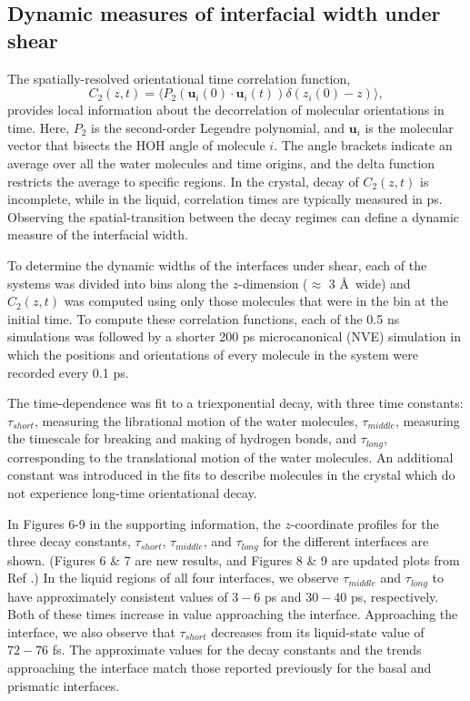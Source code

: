 \subsection{Dynamic measures of interfacial width under shear}
The spatially-resolved orientational time correlation function,
\begin{equation}\label{C(t)1}
  C_{2}(z,t)=\langle P_{2}(\mathbf{u}_i(0)\cdot \mathbf{u}_i(t))
  \delta(z_i(0) - z) \rangle,
\end{equation}
provides local information about the decorrelation of molecular
orientations in time. Here, $P_{2}$ is the second-order Legendre
polynomial, and $\mathbf{u}_i$ is the molecular vector that bisects
the HOH angle of molecule $i$.  The angle brackets indicate an average
over all the water molecules and time origins, and the delta function
restricts the average to specific regions. In the crystal, decay of
$C_2(z,t)$ is incomplete, while in the liquid, correlation times are
typically measured in ps.  Observing the spatial-transition between
the decay regimes can define a dynamic measure of the interfacial
width.

To determine the dynamic widths of the interfaces under shear, each of
the systems was divided into bins along the $z$-dimension ($\approx$ 3
\AA\ wide) and $C_2(z,t)$ was computed using only those molecules that
were in the bin at the initial time.  To compute these correlation
functions, each of the 0.5 ns simulations was followed by a shorter
200 ps microcanonical (NVE) simulation in which the positions and
orientations of every molecule in the system were recorded every 0.1
ps. 

The time-dependence was fit to a triexponential decay, with three time
constants: $\tau_{short}$, measuring the librational motion of the
water molecules, $\tau_{middle}$, measuring the timescale for breaking
and making of hydrogen bonds, and $\tau_{long}$, corresponding to the
translational motion of the water molecules.  An additional constant
was introduced in the fits to describe molecules in the crystal which
do not experience long-time orientational decay.

In Figures 6-9 in the supporting information, the $z$-coordinate
profiles for the three decay constants, $\tau_{short}$,
$\tau_{middle}$, and $\tau_{long}$ for the different interfaces are
shown.  (Figures 6 \& 7 are new results, and Figures 8 \& 9 are
updated plots from Ref \citealp{Louden13a}.)  In the liquid regions of
all four interfaces, we observe $\tau_{middle}$ and $\tau_{long}$ to
have approximately consistent values of $3-6$ ps and $30-40$ ps,
respectively.  Both of these times increase in value approaching the
interface.  Approaching the interface, we also observe that
$\tau_{short}$ decreases from its liquid-state value of $72-76$ fs.
The approximate values for the decay constants and the trends
approaching the interface match those reported previously for the
basal and prismatic interfaces.

